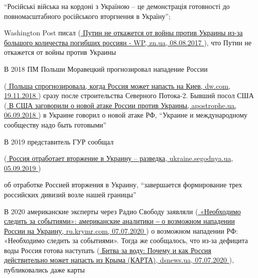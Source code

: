 \enquote{Російські війська на кордоні з Україною – це демонстрація готовності до
повномасштабного російського вторгнення в Україну}; 

Washington Post писал
(\href{https://zn.ua/UKRAINE/putin-ne-otkazhetsya-ot-voyny-protiv-ukrainy-iz-za-bolshogo-kolichestva-pogibshih-rossiyan-wp-256547_.html}{%
Путин не откажется от войны против Украины из-за большого количества погибших россиян - WP, %
zn.ua, 08.08.2017%
}),
что Путин не откажется от войны против Украины

В 2018 ПМ Польши Моравецкий прогнозировал нападение России

(\href{https://www.dw.com/ru/%D0%BF%D0%BE%D0%BB%D1%8C%D1%88%D0%B0-%D1%81%D0%BF%D1%80%D0%BE%D0%B3%D0%BD%D0%BE%D0%B7%D0%B8%D1%80%D0%BE%D0%B2%D0%B0%D0%BB%D0%B0-%D0%BA%D0%BE%D0%B3%D0%B4%D0%B0-%D1%80%D0%BE%D1%81%D1%81%D0%B8%D1%8F-%D0%BC%D0%BE%D0%B6%D0%B5%D1%82-%D0%BD%D0%B0%D0%BF%D0%B0%D1%81%D1%82%D1%8C-%D0%BD%D0%B0-%D0%BA%D0%B8%D0%B5%D0%B2/a-46351227}{%
Польша спрогнозировала, когда Россия может напасть на Киев, dw.com, 19.11.2018%
}
)
сразу после строительства Северного Потока-2. Бывший посол США
(\href{https://apostrophe.ua/news/society/accidents/2018-12-06/v-ssha-zagovorili-o-novoy-atake-rossii-protiv-ukrainyi/148030}{%
В США заговорили о новой атаке России против Украины, apostrophe.ua, 06.09.2018%
})
в Украине говорил о новой атаке РФ, \enquote{Украине и международному сообществу надо
быть готовыми}

В 2019 представитель ГУР сообщал

(\href{https://ukraine.segodnya.ua/ukraine/rossiya-otrabotaet-vtorzhenie-v-ukrainu-ukrainskaya-razvedka-1326694.html}{%
Россия отработает вторжение в Украину – разведка, ukraine.segodnya.ua, 05.09.2019%
})

об отработке Россией вторжения в Украину, \enquote{завершается формирование трех
российских дивизий возле нашей границы}

В 2020 американские эксперты через Радио Свободу заявляли
(\href{https://ru.krymr.com/a/analitiki-ssha-o-vozmozhnom-napadenii-rossii-na-ukrainu/30711677.html}{%
«Необходимо следить за событиями»: американские аналитики ‒ о возможном нападении России на Украину, %
ru.krymr.com, 07.07.2020%
})
о возможном нападении РФ: «Необходимо следить за событиями». Тогда же сообщалось,
что из-за дефицита воды Россия готова наступать
(\href{https://www.dsnews.ua/politics/bitva-za-vodu-pochemu-i-kak-rossiya-deystvitelno-mozhet-napast-07072020101500}{%
Битва за воду: Почему и как Россия действительно может напасть из Крыма (КАРТА), dsnews.ua, 07.07.2020%
}),
публиковались даже карты

